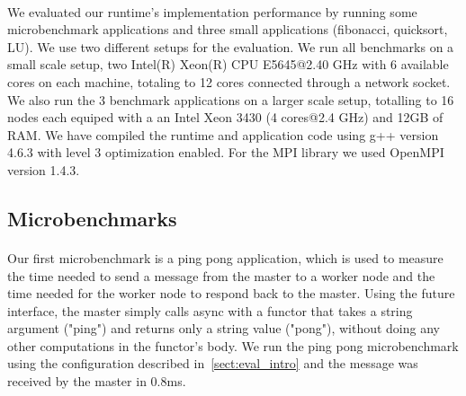 \paragraph{}
	We evaluated our runtime's implementation performance by running some microbenchmark applications and
three small applications (fibonacci, quicksort, LU).  We use two different setups for the evaluation.
We run all benchmarks on a small scale setup, two Intel(R) Xeon(R) 
CPU E5645@2.40 GHz with 6 available cores on each machine, totaling to 12 cores connected through 
a network socket. We also run the 3 benchmark applications on a larger scale setup, totalling to 16 nodes
each equiped with a an Intel Xeon 3430 (4 cores@2.4 GHz) and 12GB of RAM. 
We have compiled the runtime and application code using g++ version 4.6.3 with 
level 3 optimization enabled.  For the MPI library we used OpenMPI version 1.4.3.

\subsection{Microbenchmarks}
\label{sect:microbenchmark}
\paragraph{}
	Our first microbenchmark is a ping pong application, which is used to measure the time needed to send a 
message from the master to a worker node and the time needed for the worker node to respond back to the master.
Using the future interface, the master simply calls async with a functor that takes a string argument ("ping") 
and returns only a string value ("pong"), without doing any other computations in the functor's body.  We run
the ping pong microbenchmark using the configuration described in~\ref{sect:eval_intro} and the message was 
received by the master in 0.8ms.

